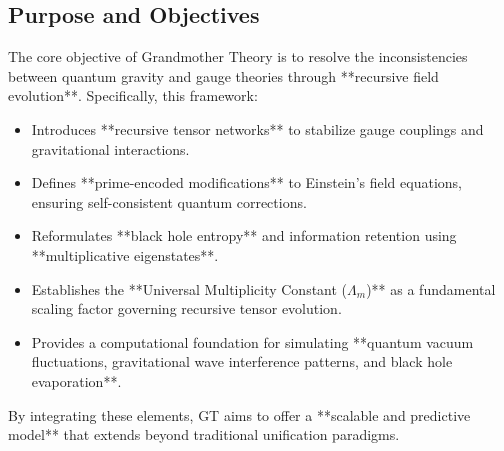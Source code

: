 \documentclass{article}
\theoremstyle{plain}
\begin{document}
\subsection{Purpose and Objectives}
The core objective of Grandmother Theory is to resolve the inconsistencies between quantum gravity and gauge theories through **recursive field evolution**. Specifically, this framework:
\begin{itemize}
    \item Introduces **recursive tensor networks** to stabilize gauge couplings and gravitational interactions.
    \item Defines **prime-encoded modifications** to Einstein's field equations, ensuring self-consistent quantum corrections.
    \item Reformulates **black hole entropy** and information retention using **multiplicative eigenstates**.
    \item Establishes the **Universal Multiplicity Constant ($\Lambda_m$)** as a fundamental scaling factor governing recursive tensor evolution.
    \item Provides a computational foundation for simulating **quantum vacuum fluctuations, gravitational wave interference patterns, and black hole evaporation**.
\end{itemize}
By integrating these elements, GT aims to offer a **scalable and predictive model** that extends beyond traditional unification paradigms.
\end{document}
